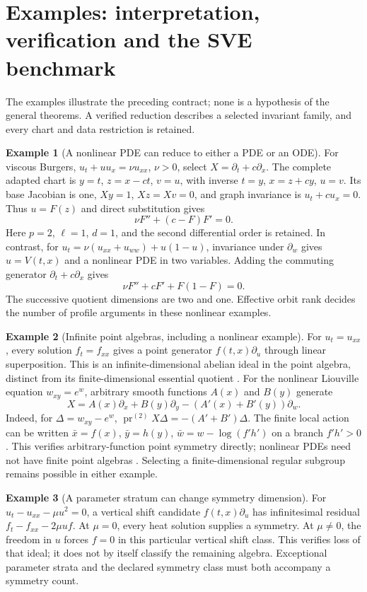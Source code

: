 \documentclass[11pt]{article}
\theoremstyle{definition}
\newtheorem{example}{Example}[section]
\newcommand{\pr}{\operatorname{pr}}
\begin{document}
\clearpage
\section{Examples: interpretation, verification and the SVE benchmark}
\label{sec:examples}
The examples illustrate the preceding contract; none is a hypothesis of the
general theorems. A verified reduction describes a selected invariant family,
and every chart and data restriction is retained.

\begin{example}[A nonlinear PDE can reduce to either a PDE or an ODE]
For viscous Burgers, $u_t+uu_x=\nu u_{xx}$, $\nu>0$, select
$X=\partial_t+c\partial_x$. The complete adapted chart is
$y=t$, $z=x-ct$, $v=u$, with inverse $t=y$, $x=z+cy$, $u=v$.
Its base Jacobian is one, $Xy=1$, $Xz=Xv=0$, and graph invariance is
$u_t+cu_x=0$. Thus $u=F(z)$ and direct substitution gives
\[
 \nu F''+(c-F)F'=0.
\]
Here $p=2$, $\ell=1$, $d=1$, and the second differential order is retained.
In contrast, for $u_t=\nu(u_{xx}+u_{ww})+u(1-u)$, invariance under
$\partial_w$ gives $u=V(t,x)$ and a nonlinear PDE in two variables.
Adding the commuting generator $\partial_t+c\partial_x$ gives
\[
 \nu F''+cF'+F(1-F)=0.
\]
The successive quotient dimensions are two and one. Effective orbit rank
decides the number of profile arguments in these nonlinear examples.
\end{example}

\begin{example}[Infinite point algebras, including a nonlinear example]
For $u_t=u_{xx}$, every solution $f_t=f_{xx}$ gives a point generator
$f(t,x)\partial_u$ through linear superposition. This is an
infinite-dimensional abelian ideal in the point algebra, distinct from its
finite-dimensional essential quotient \cite{koval2023}.
For the nonlinear Liouville equation $w_{xy}=e^w$, arbitrary smooth
functions $A(x)$ and $B(y)$ generate
\[
 X=A(x)\partial_x+B(y)\partial_y
                  -(A'(x)+B'(y))\partial_w.
\]
Indeed, for $\Delta=w_{xy}-e^w$,
$\pr^{(2)}X\Delta=-(A'+B')\Delta$. The finite local action can be written
$\bar x=f(x)$, $\bar y=h(y)$,
$\bar w=w-\log(f'h')$ on a branch $f'h'>0$. This verifies arbitrary-function
point symmetry directly; nonlinear PDEs need not have finite point algebras
\cite{levi2015}. Selecting a finite-dimensional regular subgroup remains
possible in either example.
\end{example}

\begin{example}[A parameter stratum can change symmetry dimension]
For $u_t-u_{xx}-\mu u^2=0$, a vertical shift candidate
$f(t,x)\partial_u$ has infinitesimal residual
$f_t-f_{xx}-2\mu uf$. At $\mu=0$, every heat solution supplies a symmetry.
At $\mu\ne0$, the freedom in $u$ forces $f=0$ in this particular vertical
shift class. This verifies loss of that ideal; it does not by itself classify
the remaining algebra. Exceptional parameter strata and the declared
symmetry class must both accompany a symmetry count.
\end{example}
\end{document}
